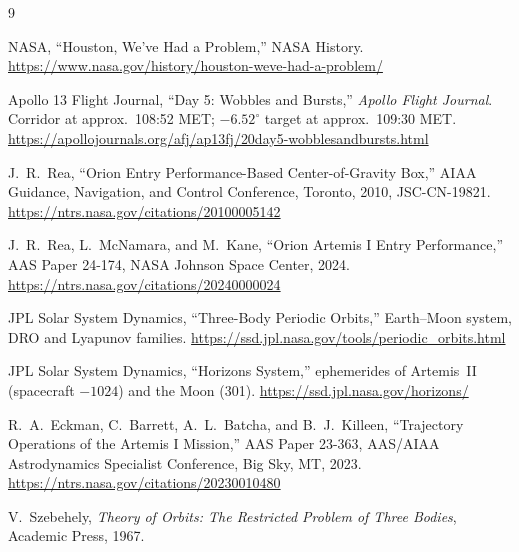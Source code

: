 \documentclass[11pt]{article}
\begin{document}
\begin{thebibliography}{9}

NASA, ``Houston, We've Had a Problem,'' NASA History.
\url{https://www.nasa.gov/history/houston-weve-had-a-problem/}

Apollo 13 Flight Journal, ``Day 5: Wobbles and Bursts,'' \emph{Apollo Flight Journal}. Corridor at approx.\ 108:52 MET; $-6.52^\circ$ target at approx.\ 109:30 MET.
\url{https://apollojournals.org/afj/ap13fj/20day5-wobblesandbursts.html}

J.~R.~Rea, ``Orion Entry Performance-Based Center-of-Gravity Box,'' AIAA Guidance, Navigation, and Control Conference, Toronto, 2010, JSC-CN-19821.
\url{https://ntrs.nasa.gov/citations/20100005142}

J.~R.~Rea, L.~McNamara, and M.~Kane, ``Orion Artemis I Entry Performance,'' AAS Paper 24-174, NASA Johnson Space Center, 2024.
\url{https://ntrs.nasa.gov/citations/20240000024}

JPL Solar System Dynamics, ``Three-Body Periodic Orbits,'' Earth--Moon system, DRO and Lyapunov families.
\url{https://ssd.jpl.nasa.gov/tools/periodic_orbits.html}

JPL Solar System Dynamics, ``Horizons System,'' ephemerides of Artemis~II (spacecraft $-1024$) and the Moon (301).
\url{https://ssd.jpl.nasa.gov/horizons/}

R.~A.~Eckman, C.~Barrett, A.~L.~Batcha, and B.~J.~Killeen, ``Trajectory Operations of the Artemis I Mission,'' AAS Paper 23-363, AAS/AIAA Astrodynamics Specialist Conference, Big Sky, MT, 2023.
\url{https://ntrs.nasa.gov/citations/20230010480}

V.~Szebehely, \emph{Theory of Orbits: The Restricted Problem of Three Bodies}, Academic Press, 1967.

\end{thebibliography}
\end{document}

